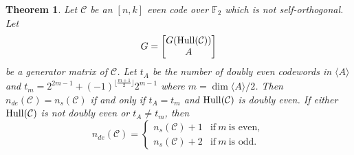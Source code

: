 \documentclass{article}
\newtheorem{theorem}{Theorem}[section]
\theoremstyle{definition}
\theoremstyle{remark}
\begin{document}
\begin{theorem}\label{doublyevenev}
    Let $\mathcal{C}$ be an $[n, k]$ even code over $\mathbb{F}_2$ which is not self-orthogonal. Let 
    \[
    G=\begin{bmatrix}G({\rm Hull}(\mathcal{C}))\\A \end{bmatrix}
    \]
    be a generator matrix of $\mathcal{C}$. Let $t_A$ be the number of doubly even codewords in $\langle A\rangle$ and $t_m=2^{2m-1}+(-1)^{\lfloor \frac{m+1}{2}\rfloor}2^{m-1}$ where $m = \dim \langle A \rangle/2$. Then $n_{de}(\mathcal{C})=n_s(\mathcal{C})$ if and only if $t_A=t_m$ and ${\rm{Hull}}(\mathcal{C})$ is doubly even. If either ${\rm Hull}(\mathcal C)$ is not doubly even or $t_A\ne t_m$, then
    \[
    n_{de}(\mathcal{C})=\begin{cases}
        n_s(\mathcal{C})+1 & \mbox{if}~m~\mbox{is even},\\
        n_s(\mathcal{C})+2 & \mbox{if}~m~\mbox{is odd}.
    \end{cases}
    \]
\end{theorem}
\end{document}
